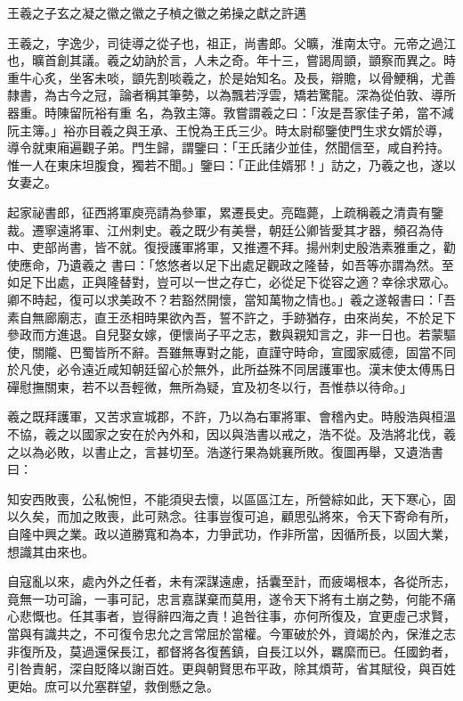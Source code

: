 
\begin{pinyinscope}

 王羲之子玄之凝之徽之徽之子楨之徽之弟操之獻之許邁



 王羲之，字逸少，司徒導之從子也，祖正，尚書郎。父曠，淮南太守。元帝之過江也，曠首創其議。羲之幼訥於言，人未之奇。年十三，嘗謁周顗，顗察而異之。時重牛心炙，坐客未啖，顗先割啖羲之，於是始知名。及長，辯贍，以骨鯁稱，尤善隸書，為古今之冠，論者稱其筆勢，以為飄若浮雲，矯若驚龍。深為從伯敦、導所器重。時陳留阮裕有重
 名，為敦主簿。敦嘗謂羲之曰：「汝是吾家佳子弟，當不減阮主簿。」裕亦目羲之與王承、王悅為王氏三少。時太尉郗鑒使門生求女婿於導，導令就東廂遍觀子弟。門生歸，謂鑒曰：「王氏諸少並佳，然聞信至，咸自矜持。惟一人在東床坦腹食，獨若不聞。」鑒曰：「正此佳婿邪！」訪之，乃羲之也，遂以女妻之。



 起家祕書郎，征西將軍庾亮請為參軍，累遷長史。亮臨薨，上疏稱羲之清貴有鑒裁。遷寧遠將軍、江州刺史。羲之既少有美譽，朝廷公卿皆愛其才器，頻召為侍中、吏部尚書，皆不就。復授護軍將軍，又推遷不拜。揚州刺史殷浩素雅重之，勸使應命，乃遺羲之
 書曰：「悠悠者以足下出處足觀政之隆替，如吾等亦謂為然。至如足下出處，正與隆替對，豈可以一世之存亡，必從足下從容之適？幸徐求眾心。卿不時起，復可以求美政不？若豁然開懷，當知萬物之情也。」羲之遂報書曰：「吾素自無廊廟志，直王丞相時果欲內吾，誓不許之，手跡猶存，由來尚矣，不於足下參政而方進退。自兒娶女嫁，便懷尚子平之志，數與親知言之，非一日也。若蒙驅使，關隴、巴蜀皆所不辭。吾雖無專對之能，直謹守時命，宣國家威德，固當不同於凡使，必令遠近咸知朝廷留心於無外，此所益殊不同居護軍也。漢末使太傅馬日
 磾慰撫關東，若不以吾輕微，無所為疑，宜及初冬以行，吾惟恭以待命。」



 羲之既拜護軍，又苦求宣城郡，不許，乃以為右軍將軍、會稽內史。時殷浩與桓溫不協，羲之以國家之安在於內外和，因以與浩書以戒之，浩不從。及浩將北伐，羲之以為必敗，以書止之，言甚切至。浩遂行果為姚襄所敗。復圖再舉，又遺浩書曰：



 知安西敗喪，公私惋怛，不能須臾去懷，以區區江左，所營綜如此，天下寒心，固以久矣，而加之敗喪，此可熟念。往事豈復可追，顧思弘將來，令天下寄命有所，自隆中興之業。政以道勝寬和為本，力爭武功，作非所當，因循所長，以固大業，
 想識其由來也。



 自寇亂以來，處內外之任者，未有深謀遠慮，括囊至計，而疲竭根本，各從所志，竟無一功可論，一事可記，忠言嘉謀棄而莫用，遂令天下將有土崩之勢，何能不痛心悲慨也。任其事者，豈得辭四海之責！追咎往事，亦何所復及，宜更虛己求賢，當與有識共之，不可復令忠允之言常屈於當權。今軍破於外，資竭於內，保淮之志非復所及，莫過還保長江，都督將各復舊鎮，自長江以外，羈縻而已。任國鈞者，引咎責躬，深自貶降以謝百姓。更與朝賢思布平政，除其煩苛，省其賦役，與百姓更始。庶可以允塞群望，救倒懸之急。




\end{pinyinscope}
